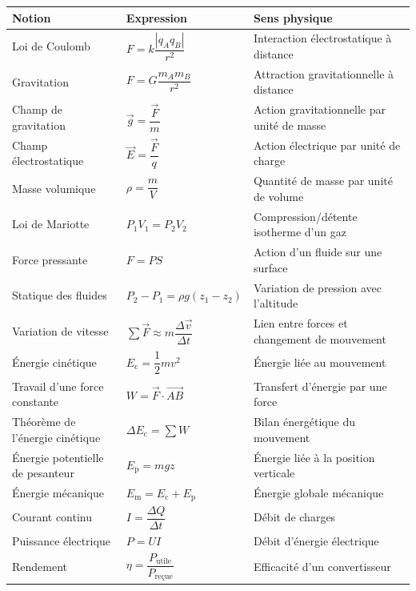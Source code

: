 \documentclass[11pt,a4paper]{article}
\newcommand{\Ec}{E_\mathrm{c}}
\newcommand{\Ep}{E_\mathrm{p}}
\newcommand{\Em}{E_\mathrm{m}}
\begin{document}
\begin{center}
\renewcommand{\arraystretch}{1.5}
\begin{tabularx}{\textwidth}{|>{\raggedright\arraybackslash}p{4.2cm}|X|X|}
\hline
\textbf{Notion} & \textbf{Expression} & \textbf{Sens physique} \\
\hline
Loi de Coulomb & $F=k\dfrac{|q_Aq_B|}{r^2}$ & Interaction électrostatique à distance \\
\hline
Gravitation & $F=G\dfrac{m_Am_B}{r^2}$ & Attraction gravitationnelle à distance \\
\hline
Champ de gravitation & $\vec{g}=\dfrac{\vec{F}}{m}$ & Action gravitationnelle par unité de masse \\
\hline
Champ électrostatique & $\vec{E}=\dfrac{\vec{F}}{q}$ & Action électrique par unité de charge \\
\hline
Masse volumique & $\rho=\dfrac{m}{V}$ & Quantité de masse par unité de volume \\
\hline
Loi de Mariotte & $P_1V_1=P_2V_2$ & Compression/détente isotherme d'un gaz \\
\hline
Force pressante & $F=PS$ & Action d'un fluide sur une surface \\
\hline
Statique des fluides & $P_2-P_1=\rho g(z_1-z_2)$ & Variation de pression avec l'altitude \\
\hline
Variation de vitesse & $\sum \vec{F}\approx m\dfrac{\Delta \vec{v}}{\Delta t}$ & Lien entre forces et changement de mouvement \\
\hline
Énergie cinétique & $\Ec=\dfrac12 mv^2$ & Énergie liée au mouvement \\
\hline
Travail d'une force constante & $W=\vec{F}\cdot \vec{AB}$ & Transfert d'énergie par une force \\
\hline
Théorème de l'énergie cinétique & $\Delta \Ec = \sum W$ & Bilan énergétique du mouvement \\
\hline
Énergie potentielle de pesanteur & $\Ep=mgz$ & Énergie liée à la position verticale \\
\hline
Énergie mécanique & $\Em=\Ec+\Ep$ & Énergie globale mécanique \\
\hline
Courant continu & $I=\dfrac{\Delta Q}{\Delta t}$ & Débit de charges \\
\hline
Puissance électrique & $P=UI$ & Débit d'énergie électrique \\
\hline
Rendement & $\eta=\dfrac{P_{\text{utile}}}{P_{\text{reçue}}}$ & Efficacité d'un convertisseur \\
\hline
\end{tabularx}
\end{center}
\end{document}
